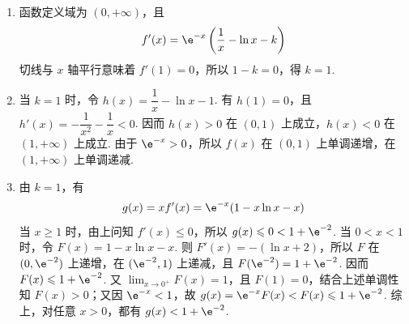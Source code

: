 \begin{solution}
\begin{enumerate}
\item 函数定义域为 \((0,+\infty)\)，且
\[
f'(x)=\e^{-x}\left(\frac1x-\ln x-k\right)
\]
切线与 \(x\) 轴平行意味着 \(f'(1)=0\)，所以 \(1-k=0\)，得 \(k=1\).
\item 当 \(k=1\) 时，令 \(h(x)=\dfrac1x-\ln x-1\). 有 \(h(1)=0\)，且 \(h'(x)=-\dfrac1{x^2}-\dfrac1x<0\). 因而 \(h(x)>0\) 在 \((0,1)\) 上成立，\(h(x)<0\) 在 \((1,+\infty)\) 上成立. 由于 \(\e^{-x}>0\)，所以 \(f(x)\) 在 \((0,1)\) 上单调递增，在 \((1,+\infty)\) 上单调递减.
\item 由 \(k=1\)，有
\[
g(x)=xf'(x)=\e^{-x}(1-x\ln x-x)
\]
当 \(x\geqslant1\) 时，由上问知 \(f'(x)\leqslant0\)，所以 \(g(x)\leqslant0<1+\e^{-2}\). 当 \(0<x<1\) 时，令 \(F(x)=1-x\ln x-x\). 则 \(F'(x)=-(\ln x+2)\)，所以 \(F\) 在 \((0,\e^{-2})\) 上递增，在 \((\e^{-2},1)\) 上递减，且 \(F(\e^{-2})=1+\e^{-2}\). 因而 \(F(x)\leqslant1+\e^{-2}\). 又 \(\lim_{x\to0^+}F(x)=1\)，且 \(F(1)=0\)，结合上述单调性知 \(F(x)>0\)；又因 \(\e^{-x}<1\)，故 \(g(x)=\e^{-x}F(x)<F(x)\leqslant1+\e^{-2}\). 综上，对任意 \(x>0\)，都有 \(g(x)<1+\e^{-2}\).
\end{enumerate}
\end{solution}

